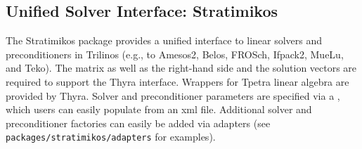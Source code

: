 \subsection{Unified Solver Interface: Stratimikos}

The Stratimikos package provides a unified interface to linear solvers and preconditioners in Trilinos (e.g., to Amesos2, Belos, FROSch, Ifpack2, MueLu, and Teko).
The matrix as well as the right-hand side and the solution vectors are required to support the Thyra interface.
Wrappers for Tpetra linear algebra are provided by Thyra.
Solver and preconditioner parameters are specified via a ,
which users can easily populate from an xml file.
Additional solver and preconditioner factories can easily be added via adapters (see \texttt{packages/stratimikos/adapters} for examples).
